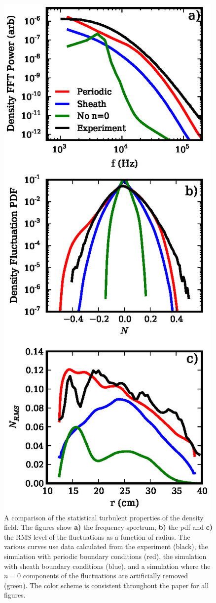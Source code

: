 \documentclass[showpacs,preprintnumbers,amsmath,amssymb,superscriptaddress,aip]{revtex4-1}
\begin{document}
\begin{figure}[!htbp]
\includegraphics[]{statistics}
\hfil
\caption{A comparison of the statistical turbulent properties of the density field. The figures show \textbf{a)} the frequency spectrum, \textbf{b)} the pdf and \textbf{c)} the RMS level
of the fluctuations as a function of radius. The various curves use data calculated from the experiment (black), the simulation with periodic boundary conditions (red), 
the simulation with sheath boundary conditions (blue), and a simulation where the $n=0$ components of the fluctuations are artificially removed (green). The color scheme is consistent
throughout the paper for all figures.}
\label{statistics}
\end{figure}
\end{document}
